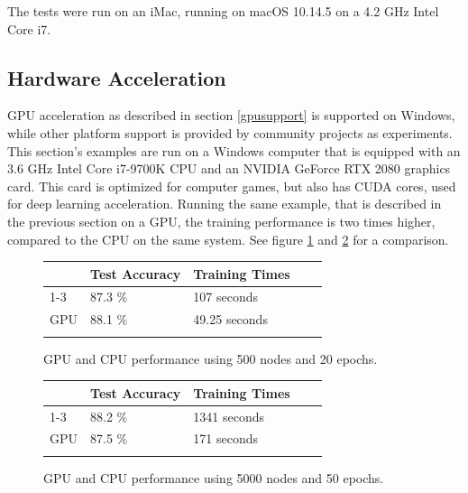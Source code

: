 \documentclass[11pt]{article}
\begin{document}
The tests were run on an iMac, running on macOS 10.14.5 on a 4.2 GHz Intel Core i7.

\subsection{Hardware Acceleration}

GPU acceleration as described in section \ref{gpusupport} is supported on Windows, while other platform support is provided by community projects as experiments.
This section's examples are run on a Windows computer that is equipped with an 3.6 GHz Intel Core i7-9700K CPU and an NVIDIA GeForce RTX 2080 graphics card.
This card is optimized for computer games, but also has CUDA cores, used for deep learning acceleration.
Running the same example, that is described in the previous section on a GPU, the training performance is two times higher, compared to the CPU on the same system.
See figure \ref{gpuperformanceoverview1} and \ref{gpuperformanceoverview2} for a comparison.

\begin{figure}[h]
\caption{GPU and CPU performance using 500 nodes and 20 epochs.}
\label{gpuperformanceoverview1}
\begin{tabular}{lllll}
\multicolumn{1}{l|}{}              & Test Accuracy & Training Times &  &  \\ \cline{1-3}
\multicolumn{1}{l|}{CPU}          & 87.3 \%       & 107 seconds    &  &  \\
\multicolumn{1}{l|}{GPU} & 88.1 \%       & 49.25 seconds  &  &  \\
                                   &               &                &  & 
\end{tabular}
\end{figure}\begin{figure}[h]

\caption{GPU and CPU performance using 5000 nodes and 50 epochs.}
\label{gpuperformanceoverview2}
\begin{tabular}{lllll}
\multicolumn{1}{l|}{}              & Test Accuracy & Training Times &  &  \\ \cline{1-3}
\multicolumn{1}{l|}{CPU}          & 88.2 \%       & 1341 seconds    &  &  \\
\multicolumn{1}{l|}{GPU} & 87.5 \%       & 171 seconds  &  &  \\
                                   &               &                &  & 
\end{tabular}
\end{figure}
\end{document}
